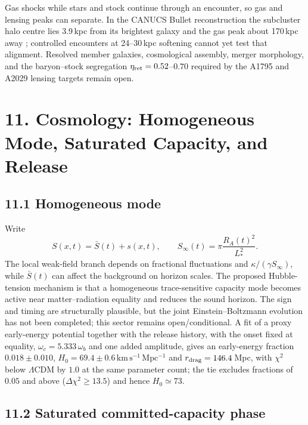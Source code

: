 \documentclass[11pt]{article}
\begin{document}
Gas shocks while stars and stock continue through an encounter, so gas and lensing peaks can separate. In the CANUCS Bullet reconstruction the subcluster halo centre lies 3.9\,kpc from its brightest galaxy and the gas peak about 170\,kpc away \citep{Rihtarsic2026Cluster}; controlled encounters at 24--30\,kpc softening cannot yet test that alignment. Resolved member galaxies, cosmological assembly, merger morphology, and the baryon--stock segregation $\eta_{\rm ret}=0.52$--$0.70$ required by the A1795 and A2029 lensing targets remain open.

\section{11. Cosmology: Homogeneous Mode, Saturated Capacity, and Release}

\subsection{11.1 Homogeneous mode}

Write
\[
S(x,t)=\bar S(t)+s(x,t),
\qquad
S_\infty(t)=\pi\frac{R_A(t)^2}{L_*^2}.
\]
The local weak-field branch depends on fractional fluctuations and $\kappa/(\gamma S_\infty)$, while $\bar S(t)$ can affect the background on horizon scales. The proposed Hubble-tension mechanism is that a homogeneous trace-sensitive capacity mode becomes active near matter--radiation equality and reduces the sound horizon. The sign and timing are structurally plausible, but the joint Einstein--Boltzmann evolution has not been completed; this sector remains open/conditional. A fit of a proxy early-energy potential together with the release history, with the onset fixed at equality, $\omega_c=5.333\,\omega_b$ and one added amplitude, gives an early-energy fraction $0.018\pm0.010$, $H_0=69.4\pm0.6\,\mathrm{km\,s^{-1}\,Mpc^{-1}}$ and $r_{\rm drag}=146.4\,$Mpc, with $\chi^2$ below $\Lambda$CDM by $1.0$ at the same parameter count; the tie excludes fractions of $0.05$ and above ($\Delta\chi^2\geq13.5$) and hence $H_0\simeq73$.

\subsection{11.2 Saturated committed-capacity phase}
\end{document}
